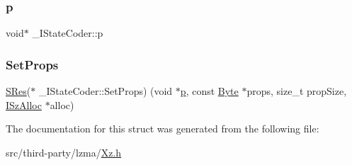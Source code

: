 \subsubsection{\texorpdfstring{p}{p}}
{\footnotesize\ttfamily void$\ast$ \+\_\+\+I\+State\+Coder\+::p}

\mbox{\label{struct___i_state_coder_a3d62dedf9587360c47c92035f955f72a}} 
\subsubsection{\texorpdfstring{Set\+Props}{SetProps}}
{\footnotesize\ttfamily \mbox{\hyperlink{7z_types_8h_acc0053eeb62726b68b22e8c7d9e91367}{S\+Res}}($\ast$ \+\_\+\+I\+State\+Coder\+::\+Set\+Props) (void $\ast$\mbox{\hyperlink{struct___i_state_coder_a7956e4f358a8e8a3e0e03f19691d2305}{p}}, const \mbox{\hyperlink{7z_types_8h_ae3a497195d617519e5353ea7b417940f}{Byte}} $\ast$props, size\+\_\+t prop\+Size, \mbox{\hyperlink{struct_i_sz_alloc}{I\+Sz\+Alloc}} $\ast$alloc)}



The documentation for this struct was generated from the following file\+:\begin{DoxyCompactItemize}
\item 
src/third-\/party/lzma/\mbox{\hyperlink{_xz_8h}{Xz.\+h}}\end{DoxyCompactItemize}
